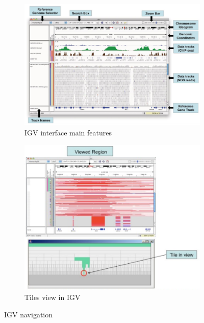 \begin{figure}[H]
    \centering
    \begin{subfigure}[t]{0.9\textwidth}
        \centering
        \includegraphics[width=1\textwidth]{IGVview.PNG}
        \caption{IGV interface main features}
        \label{subfig: IGVnavigation}
    \end{subfigure}
    \hfill
    \begin{subfigure}[t]{0.7\textwidth}
        \centering
        \includegraphics[width=1\textwidth]{TileView.PNG}
        \caption{Tiles view in IGV}
        \label{subfig: TileV}
    \end{subfigure}
    \caption{IGV navigation}
    \label{fig: IGV navigation}
\end{figure}

